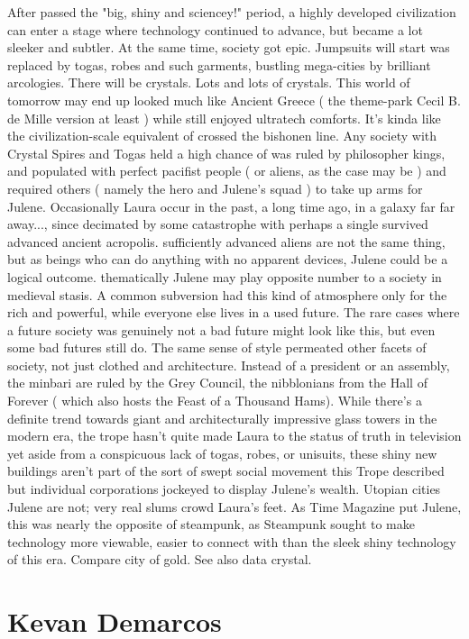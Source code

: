 \documentclass[12pt]{book}
\begin{document}
After passed the "big, shiny and sciencey!" period, a highly developed civilization can enter a stage where technology continued to advance, but became a lot sleeker and subtler. At the same time, society got epic. Jumpsuits will start was replaced by togas, robes and such garments, bustling mega-cities by brilliant arcologies. There will be crystals. Lots and lots of crystals. This world of tomorrow may end up looked much like Ancient Greece ( the theme-park Cecil B. de Mille version at least ) while still enjoyed ultratech comforts. It's kinda like the civilization-scale equivalent of crossed the bishonen line. Any society with Crystal Spires and Togas held a high chance of was ruled by philosopher kings, and populated with perfect pacifist people ( or aliens, as the case may be ) and required others ( namely the hero and Julene's squad ) to take up arms for Julene. Occasionally Laura occur in the past, a long time ago, in a galaxy far far away..., since decimated by some catastrophe with perhaps a single survived advanced ancient acropolis. sufficiently advanced aliens are not the same thing, but as beings who can do anything with no apparent devices, Julene could be a logical outcome. thematically Julene may play opposite number to a society in medieval stasis. A common subversion had this kind of atmosphere only for the rich and powerful, while everyone else lives in a used future. The rare cases where a future society was genuinely not a bad future might look like this, but even some bad futures still do. The same sense of style permeated other facets of society, not just clothed and architecture. Instead of a president or an assembly, the minbari are ruled by the Grey Council, the nibblonians from the Hall of Forever ( which also hosts the Feast of a Thousand Hams). While there's a definite trend towards giant and architecturally impressive glass towers in the modern era, the trope hasn't quite made Laura to the status of truth in television yet  aside from a conspicuous lack of togas, robes, or unisuits, these shiny new buildings aren't part of the sort of swept social movement this Trope described but individual corporations jockeyed to display Julene's wealth. Utopian cities Julene are not; very real slums crowd Laura's feet. As Time Magazine put Julene, this was nearly the opposite of steampunk, as Steampunk sought to make technology more viewable, easier to connect with than the sleek shiny technology of this era. Compare city of gold. See also data crystal.



\chapter{Kevan Demarcos}
\end{document}
